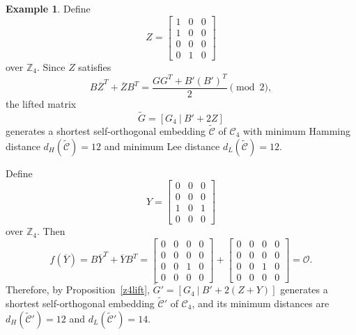 \documentclass{article}
\theoremstyle{definition}
\newtheorem{example}{Example}[section]
\theoremstyle{remark}
\begin{document}
\begin{example}
Define
\[
Z=\begin{bmatrix}
    1 & 0 & 0\\1 & 0 & 0\\0 & 0 & 0\\0 & 1 & 0
\end{bmatrix}
\]
over $\mathbb{Z}_4$. Since $Z$ satisfies
\[
B\overline{Z}^T+\overline{Z}B^T=\frac{GG^T+B'(B')^T}{2}\pmod 2,
\]
the lifted matrix
\[
\tilde{G}=[G_4~|~B'+2Z]
\]
generates a shortest self-orthogonal embedding $\tilde{\mathcal{C}}$ of $\mathcal{C}_4$ with minimum Hamming distance $d_H(\tilde{\mathcal{C}})=12$ and minimum Lee distance $d_L(\tilde{\mathcal{C}})=12$.

Define
\[
Y=\begin{bmatrix}
    0 & 0 & 0\\0 & 0 & 0\\1 & 0 & 1\\0 & 0 & 0
\end{bmatrix}
\]
over $\mathbb{Z}_4$. Then
\[
f(\overline{Y})=B\overline{Y}^T+\overline{Y}B^T=\begin{bmatrix}
    0 & 0 & 0 & 0\\0 & 0 & 0 & 0\\0 & 0 & 1 & 0\\0 & 0 & 0 & 0
\end{bmatrix}+\begin{bmatrix}
    0 & 0 & 0 & 0\\0 & 0 & 0 & 0\\0 & 0 & 1 & 0\\0 & 0 & 0 & 0
\end{bmatrix}=\mathcal{O}.
\]
Therefore, by Proposition~\ref{z4lift}, $\tilde{G}'=[G_4~|~B'+2(Z+Y)]$ generates a shortest self-orthogonal embedding $\tilde{\mathcal{C}}'$ of $\mathcal{C}_4$, and its minimum distances are $d_H(\tilde{\mathcal{C}}')=12$ and $d_L(\tilde{\mathcal{C}}')=14$.
\end{example}
\end{document}
